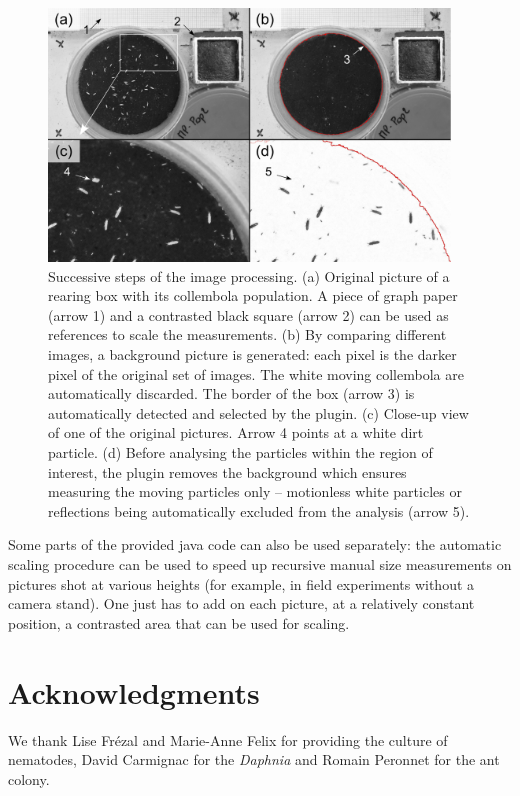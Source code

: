 \begin{figure}[!ht] %
\centering
\includegraphics[width=0.95\textwidth]{2_Methodo/Fig/FigS3.pdf} 
\caption[Successive steps of the image processing]{
Successive steps of the image processing. (a) Original picture of a rearing box
with its collembola population. A piece of graph paper (arrow 1) and a
contrasted black square (arrow 2) can be used as references to scale the
measurements. (b) By comparing different images, a background picture is
generated: each pixel is the darker pixel of the original set of images. The
white moving collembola are automatically discarded. The border of the box
(arrow 3) is automatically detected and selected by the plugin. (c) Close-up
view of one of the original pictures. Arrow 4 points at a white dirt particle.
(d) Before analysing the particles within the region of interest, the plugin
removes the background which ensures measuring the moving particles only –
motionless white particles or reflections being automatically excluded from the
analysis (arrow 5).}
\label{Fig21-S3}
\end{figure}


Some parts of the provided java code can also be used separately: the automatic
scaling procedure can be used to speed up recursive manual size measurements on
pictures shot at various heights (for example, in field experiments without a
camera stand). One just has to add on each picture, at a relatively constant
position, a contrasted area that can be used for scaling.




\section{Acknowledgments}
We thank Lise Frézal and Marie-Anne Felix for providing the culture of
nematodes, David Carmignac for the \textit{Daphnia} and Romain Peronnet for the ant
colony.